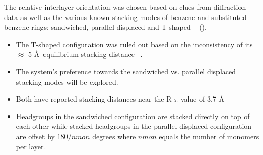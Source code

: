 \documentclass{article}
\newcommand{\angstrom}{\textup{\AA}}
\begin{document}
  The relative interlayer orientation was chosen based on clues from 
  diffraction data as well as the various known stacking modes of benzene 
  and substituted benzene rings: sandwiched, parallel-displaced and T-shaped
  ~\cite{sinnokrot_estimates_2002} ().
  \begin{itemize}
    \item The T-shaped configuration was ruled out based on the inconsistency of
    its $\approx$ 5 \angstrom~equilibrium stacking distance ~\cite{sinnokrot_estimates_2002}.
    \item The system's preference towards the sandwiched vs. parallel displaced 
    stacking modes will be explored.
    \item Both have reported stacking distances near the R-$\pi$ value of 3.7 \angstrom %
    \item Headgroups in the sandwiched configuration are stacked directly on top of
    each other while stacked headgroups in the parallel displaced configuration are offset 
    by $180/nmon$ degrees where $nmon$ equals the number of monomers per layer.
  \end{itemize}

\end{document}
